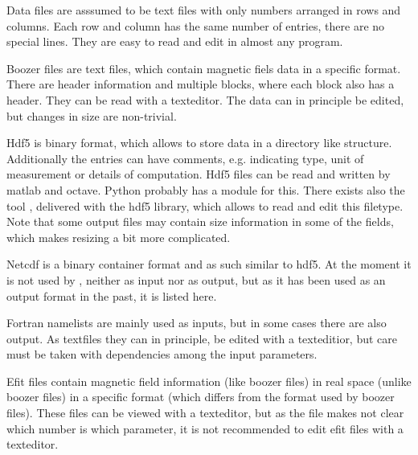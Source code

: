 Data files are asssumed to be text files with only numbers arranged in
rows and columns. Each row and column has the same number of entries,
there are no special lines.
They are easy to read and edit in almost any program.

Boozer files are text files, which contain magnetic fiels data in a
specific format. There are header information and multiple blocks, where
each block also has a header.
They can be read with a texteditor. The data can in principle be edited,
but changes in size are non-trivial.

Hdf5 is binary format, which allows to store data in a directory like
structure. Additionally the entries can have comments, e.g. indicating
type, unit of measurement or details of computation.
Hdf5 files can be read and written by matlab and octave. Python probably
has a module for this. There exists also the tool ,
delivered with the hdf5 library, which allows to read and edit this
filetype.
Note that some output files may contain size information in some of the
fields, which makes resizing a bit more complicated.

Netcdf is a binary container format and as such similar to hdf5. At the
moment it is not used by \neotwo, neither as input nor as output, but as
it has been used as an output format in the past, it is listed here.

Fortran namelists are mainly used as inputs, but in some cases there are
also output. As textfiles they can in principle, be edited with a
texteditior, but care must be taken with dependencies among the input
parameters.

Efit files contain magnetic field information (like boozer files) in
real space (unlike boozer files) in a specific format (which differs
from the format used by boozer files). These files can be viewed with
a texteditor, but as the file makes not clear which number is which
parameter, it is not recommended to edit efit files with a texteditor.


